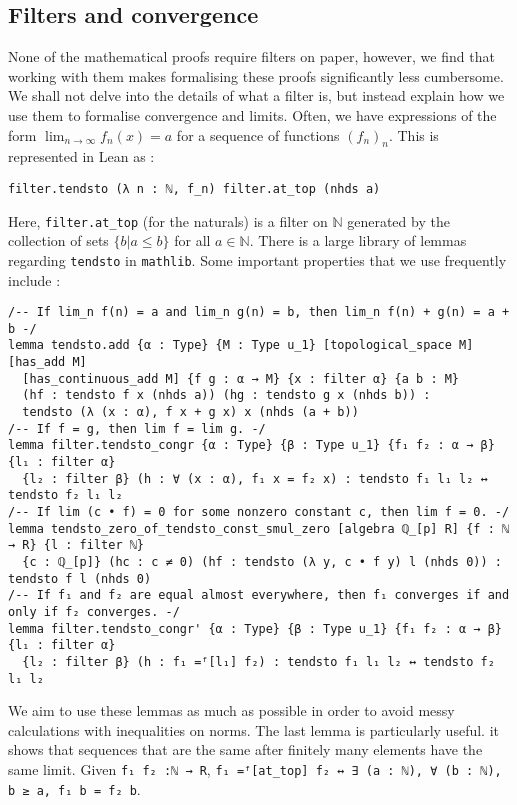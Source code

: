 \documentclass[a4paper,UKenglish,cleveref, autoref, thm-restate]{lipics-v2021}
\newcommand{\lean}[1]{\texttt{#1}\xspace} %
\begin{document}
\subsection{Filters and convergence}
None of the mathematical proofs require filters on paper, however, we find that working with them makes 
formalising these proofs significantly less cumbersome. We shall not delve into the details of what a 
filter is, but instead explain how we use them to formalise convergence and limits. 
Often, we have expressions of the form $\lim_{n \to \infty} f_n(x) = a$ for a sequence of functions $(f_n)_n$. 
This is represented in Lean as :
\begin{lstlisting}
filter.tendsto (λ n : ℕ, f_n) filter.at_top (nhds a)
\end{lstlisting}
Here, \lean{filter.at\_top} (for the naturals) is a filter on $\mathbb{N}$ generated by the collection of sets $\{ b | a \leq b \}$ 
for all $a \in \mathbb{N}$. There is a large library of lemmas regarding \lean{tendsto} in \lean{mathlib}. 
Some important properties that we use frequently include :
\begin{lstlisting}
/-- If lim_n f(n) = a and lim_n g(n) = b, then lim_n f(n) + g(n) = a + b -/
lemma tendsto.add {α : Type} {M : Type u_1} [topological_space M] [has_add M] 
  [has_continuous_add M] {f g : α → M} {x : filter α} {a b : M} 
  (hf : tendsto f x (nhds a)) (hg : tendsto g x (nhds b)) : 
  tendsto (λ (x : α), f x + g x) x (nhds (a + b))
/-- If f = g, then lim f = lim g. -/
lemma filter.tendsto_congr {α : Type} {β : Type u_1} {f₁ f₂ : α → β} {l₁ : filter α} 
  {l₂ : filter β} (h : ∀ (x : α), f₁ x = f₂ x) : tendsto f₁ l₁ l₂ ↔ tendsto f₂ l₁ l₂
/-- If lim (c • f) = 0 for some nonzero constant c, then lim f = 0. -/
lemma tendsto_zero_of_tendsto_const_smul_zero [algebra ℚ_[p] R] {f : ℕ → R} {l : filter ℕ} 
  {c : ℚ_[p]} (hc : c ≠ 0) (hf : tendsto (λ y, c • f y) l (nhds 0)) : tendsto f l (nhds 0) 
/-- If f₁ and f₂ are equal almost everywhere, then f₁ converges if and only if f₂ converges. -/
lemma filter.tendsto_congr' {α : Type} {β : Type u_1} {f₁ f₂ : α → β} {l₁ : filter α} 
  {l₂ : filter β} (h : f₁ =ᶠ[l₁] f₂) : tendsto f₁ l₁ l₂ ↔ tendsto f₂ l₁ l₂
\end{lstlisting}
We aim to use these lemmas as much as possible in order to avoid messy calculations with inequalities on norms. 
The last lemma is particularly useful. it shows that sequences that are the same after finitely many 
elements have the same limit. Given \lean{f₁ f₂ :ℕ → R}, \lean{f₁ =ᶠ[at\_top] f₂ ↔ ∃ (a : ℕ), ∀ (b : ℕ), b ≥ a, f₁ b = f₂ b}. 
\end{document}
